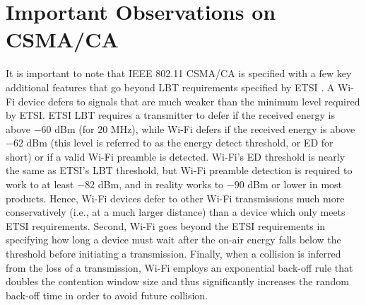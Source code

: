 \section{Important Observations on CSMA/CA}
\label{csmaca-obs}

It is important to note that IEEE 802.11 CSMA/CA is specified with a few key additional features that go beyond LBT requirements specified by ETSI \cite{LBT-ETSI-2014}. A \mbox{Wi-Fi} device defers to signals that are much weaker than the minimum level required by ETSI. ETSI LBT requires a transmitter to defer if the received energy is above $-60$ dBm (for $20$ MHz), while \mbox{Wi-Fi} defers if the received energy is above $-62$ dBm (this level is referred to as the energy detect threshold, or ED for short) or if a valid \mbox{Wi-Fi} preamble is detected. \mbox{Wi-Fi}'s ED threshold is nearly the same as ETSI's LBT threshold, but \mbox{Wi-Fi} preamble detection is required to work to at least $-82$ dBm, and in reality works to $-90$ dBm or lower in most products. Hence, \mbox{Wi-Fi} devices defer to other \mbox{Wi-Fi} transmissions much more conservatively (i.e., at a much larger distance) than a device which only meets ETSI requirements. Second, \mbox{Wi-Fi} goes beyond the ETSI requirements in specifying how long a device must wait after the on-air energy falls below the threshold before initiating a transmission. Finally, when a collision is inferred from the loss of a transmission, \mbox{Wi-Fi} employs an exponential back-off rule that doubles the contention window size and thus significantly increases the random back-off time in order to avoid future collision.

